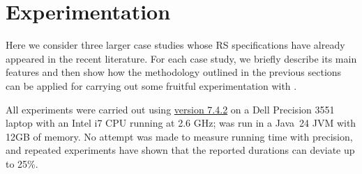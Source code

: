 
\section{Experimentation}\label{sec:experiments}

Here we consider 
three larger case studies whose RS specifications have already appeared in the recent literature. For each case study, we briefly describe its main features and then show how the methodology outlined in the previous sections can be applied for carrying out some fruitful experimentation with \GROOVE.

All \GROOVE experiments were carried out using \href{https://github.com/nl-utwente-groove/code/releases/tag/release-7_4_2}{\GROOVE version 7.4.2} on a Dell Precision 3551 laptop with an Intel i7 CPU running at 2.6 GHz; \GROOVE was run in a Java~24 JVM with 12GB of memory. No attempt was made to measure running time with precision, and repeated experiments have shown that the reported durations can deviate up to 25\%.
